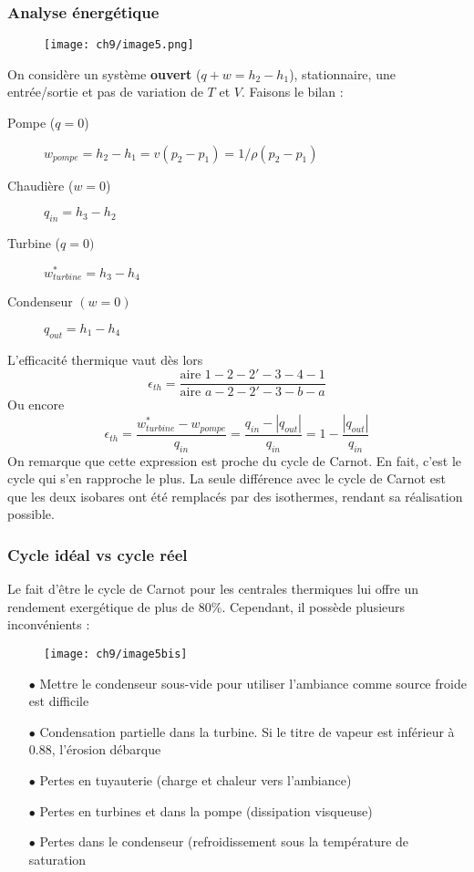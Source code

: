 		\subsubsection{Analyse énergétique}
		\begin{wrapfigure}[8]{r}{4cm}
		\vspace{-5mm}
		\texttt{[image: ch9/image5.png]}
		\end{wrapfigure}
		On considère un système \textbf{ouvert} ($q+w = h_2-h_1$), stationnaire, 
		une entrée/sortie et pas de variation de $T$ et $V$. Faisons le bilan :
		\begin{description}
		\item[Pompe ($q=0$)] $w_{pompe} = h_2-h_1 = v(p_2-p_1)=1/\rho(p_2-p_1)$
		\item[Chaudière ($w=0$)] $q_{in} = h_3-h_2$
		\item[Turbine ($q=0)$] $w_{turbine}^* = h_3-h_4$
		\item[Condenseur $(w=0)$] $q_{out} = h_1-h_4$
		\end{description}
		L’efficacité thermique vaut dès lors 
		\begin{equation}
		\epsilon_{th} = \dfrac{\text{aire } 1-2-2'-3-4-1}{\text{aire } a-2-2'-3-b-a}
		\end{equation}
		Ou encore 
		\begin{equation}
		\epsilon_{th} = \dfrac{w_{turbine}^*-w_{pompe}}{q_{in}} = \dfrac{q_{in}-|q_{out}|}{
		q_{in}} = 1-\dfrac{|q_{out}|}{q_{in}}
		\end{equation}
		On remarque que cette expression est proche du cycle de Carnot. En fait, c'est 
		le cycle qui s'en rapproche le plus. La seule différence avec le cycle de Carnot 
		est que les deux isobares ont été remplacés par des isothermes, rendant sa 
		réalisation possible. 
		
		\newpage
		\subsubsection{Cycle idéal vs cycle réel}
		Le fait d’être le cycle de Carnot pour les centrales thermiques lui offre un 
		rendement exergétique de plus de 80\%. Cependant, il possède plusieurs 
		inconvénients :\\
		\begin{wrapfigure}[8]{r}{5cm}
			\texttt{[image: ch9/image5bis]}
		\end{wrapfigure}
		\begin{itemize}
		\item[$\bullet$] Mettre le condenseur sous-vide pour utiliser l'ambiance 
		comme source froide est difficile
		\item[$\bullet$] Condensation partielle dans la turbine. Si le titre de 
		vapeur est inférieur à 0.88, l’érosion débarque
		\item[$\bullet$] Pertes en tuyauterie (charge et chaleur vers l'ambiance)
		\item[$\bullet$] Pertes en turbines et dans la pompe (dissipation visqueuse)
		\item[$\bullet$] Pertes dans le condenseur (refroidissement sous la température de saturation
		\end{itemize}

